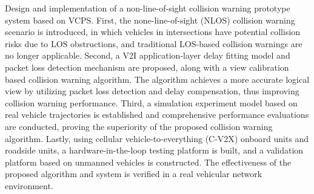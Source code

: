 \begin{eabstract}
 Design and implementation of a non-line-of-sight collision warning prototype system based on VCPS.
First, the none-line-of-sight (NLOS) collision warning scenario is introduced, in which vehicles in intersections have potential collision risks due to LOS obstructions, and traditional LOS-based collision warnings are no longer applicable.
Second, a V2I application-layer delay fitting model and packet loss detection mechanism are proposed, along with a view calibration based collision warning algorithm. 
The algorithm achieves a more accurate logical view by utilizing packet loss detection and delay compensation, thus improving collision warning performance.
Third, a simulation experiment model based on real vehicle trajectories is established and comprehensive performance evaluations are conducted, proving the superiority of the proposed collision warning algorithm.
Lastly, using cellular vehicle-to-everything (C-V2X) onboard units and roadside units, a hardware-in-the-loop testing platform is built, and a validation platform based on unmanned vehicles is constructed. 
The effectiveness of the proposed algorithm and system is verified in a real vehicular network environment.
 
\end{eabstract}

